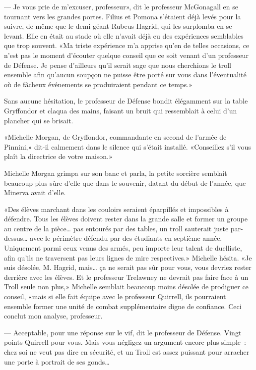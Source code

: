 --- Je vous prie de m'excuser, professeur», dit le professeur McGonagall en se tournant vers les grandes portes. Filius et Pomona s'étaient déjà levés pour la suivre, de même que le demi-géant Rubeus Hagrid, qui les surplomba en se levant. Elle en était au stade où elle n'avait déjà eu des expériences semblables que trop souvent. «Ma triste expérience m'a apprise qu'en de telles occasions, ce n'est pas le moment d'écouter quelque conseil que ce soit venant d'un professeur de Défense. Je pense d'ailleurs qu'il serait sage que nous cherchions le troll ensemble afin qu'aucun soupçon ne puisse être porté sur vous dans l'éventualité où de fâcheux événements se produiraient pendant ce temps.»

Sans aucune hésitation, le professeur de Défense bondit élégamment sur la table Gryffondor et claqua des mains, faisant un bruit qui ressemblait à celui d'un plancher qui se brisait.

«Michelle Morgan, de Gryffondor, commandante en second de l'armée de Pinnini,» dit-il calmement dans le silence qui s'était installé. «Conseillez s'il vous plaît la directrice de votre maison.»

Michelle Morgan grimpa sur son banc et parla, la petite sorcière semblait beaucoup plus sûre d'elle que dans le souvenir, datant du début de l'année, que Minerva avait d'elle.

«Des élèves marchant dans les couloirs seraient éparpillés et impossibles à défendre. Tous les élèves doivent rester dans la grande salle et former un groupe au centre de la pièce… pas entourés par des tables, un troll sauterait juste par-dessus… avec le périmètre défendu par des étudiants en septième année. Uniquement parmi ceux venus des armés, peu importe leur talent de duelliste, afin qu'ils ne traversent pas leurs lignes de mire respectives.» Michelle hésita. «Je suis désolée, M. Hagrid, mais… ça ne serait pas sûr pour vous, vous devriez rester derrière avec les élèves. Et le professeur Trelawney ne devrait pas faire face à un Troll seule non plus,» Michelle semblait beaucoup moins désolée de prodiguer ce conseil, «mais si elle fait équipe avec le professeur Quirrell, ils pourraient ensemble former une unité de combat supplémentaire digne de confiance. Ceci conclut mon analyse, professeur.

--- Acceptable, pour une réponse sur le vif, dit le professeur de Défense. Vingt points Quirrell pour vous. Mais vous négligez un argument encore plus simple~: chez soi ne veut pas dire en sécurité, et un Troll est assez puissant pour arracher une porte à portrait de ses gonds…


